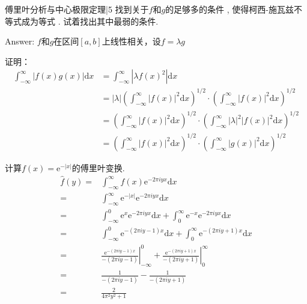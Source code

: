 \newChapter 傅里叶分析与中心极限定理|5
\exer 找到关于$f$和$g$的足够多的条件 , 使得柯西-施瓦兹不等式成为等式 . 试着找出其中最弱的条件.\par
Answer: $f$和$g$在区间$[a,b]$上线性相关，设$f=\lambda g$\par
证明：\begin{align*}
\int_{-\infty}^{\infty}|f(x)g(x)|\mathrm dx &=\int_{-\infty}^{\infty}|\lambda f(x)^2|\mathrm dx \\
&=|\lambda|\left(\int_{-\infty}^{\infty}|f(x)|^2\mathrm dx\right)^{1/2}\cdot\left(\int_{-\infty}^{\infty}|f(x)|^2\mathrm dx\right)^{1/2} \\
&=\left(\int_{-\infty}^{\infty}|f(x)|^2\mathrm dx\right)^{1/2}\cdot\left(\int_{-\infty}^{\infty}|\lambda|^2|f(x)|^2\mathrm dx\right)^{1/2} \\
&=\left(\int_{-\infty}^{\infty}|f(x)|^2\mathrm dx\right)^{1/2}\cdot\left(\int_{-\infty}^{\infty}|g(x)|^2\mathrm dx\right)^{1/2} 
\end{align*}

\exer 计算$f(x) =\mathrm e^{-|x|}$的傅里叶变换.
\begin{align*}
\widehat{f}(y)=&\int_{-\infty}^{\infty}f(x)\mathrm e^{-2\pi iyx}\mathrm dx \\
=&\int_{-\infty}^{\infty}\mathrm e^{-|x|}\mathrm e^{-2\pi iyx}\mathrm dx \\
=&\int_{-\infty}^{0}\mathrm e^{x}\mathrm e^{-2\pi iyx}\mathrm dx + \int_{0}^{\infty}\mathrm e^{-x}\mathrm e^{-2\pi iyx}\mathrm dx \\
=&\int_{-\infty}^{0}\mathrm e^{-(2\pi iy-1)x}\mathrm dx + \int_{0}^{\infty}\mathrm e^{-(2\pi iy+1)x}\mathrm dx \\
=&\left.\frac{\mathrm e^{-(2\pi iy-1)x}}{-(2\pi iy-1)}\right|_{-\infty}^{0} + \left.\frac{\mathrm e^{-(2\pi iy+1)x}}{-(2\pi iy+1)}\right|_0^{\infty} \\
=&\frac{1}{-(2\pi iy-1)} - \frac{1}{-(2\pi iy+1)} \\
=&\frac{2}{4\pi^2y^2+1} \\
\end{align*}
